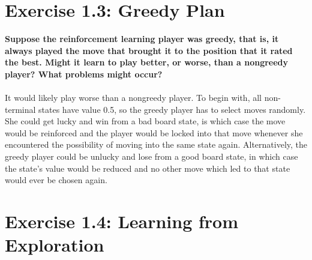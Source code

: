 \documentclass[a4paper,11pt]{article}
\numberwithin{equation}{section}
\theoremstyle{remark}
\begin{document}
\section{Exercise 1.3: Greedy Plan}

\textbf{Suppose the reinforcement learning player was greedy, that is, it always played the move that brought it to the position that it rated the best. Might it learn to play better, or worse, than a nongreedy player? What problems might occur?}
\\ \\
It would likely play worse than a nongreedy player. To begin with, all non-terminal states have value 0.5, so the greedy player has to select moves randomly. She could get lucky and win from a bad board state, is which case the move would be reinforced and the player would be locked into that move whenever she encountered the possibility of moving into the same state again. Alternatively, the greedy player could be unlucky and lose from a good board state, in which case the state's value would be reduced and no other move which led to that state would ever be chosen again.


\section{Exercise 1.4: Learning from Exploration}
\end{document}
